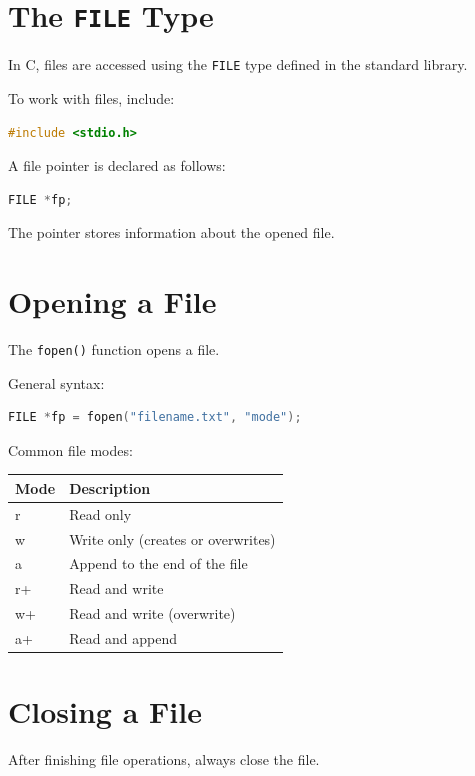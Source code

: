 \documentclass[12pt,openany]{book}
\begin{document}
\section{The \texttt{FILE} Type}

In C, files are accessed using the \texttt{FILE} type defined in the standard library.

To work with files, include:

\begin{lstlisting}[language=C]
#include <stdio.h>
\end{lstlisting}

A file pointer is declared as follows:

\begin{lstlisting}[language=C]
FILE *fp;
\end{lstlisting}

The pointer stores information about the opened file.
\section{Opening a File}

The \texttt{fopen()} function opens a file.

General syntax:

\begin{lstlisting}[language=C]
FILE *fp = fopen("filename.txt", "mode");
\end{lstlisting}

Common file modes:

\begin{center}
\begin{tabular}{|l|l|}
\hline
Mode & Description \\
\hline
r & Read only \\
w & Write only (creates or overwrites) \\
a & Append to the end of the file \\
r+ & Read and write \\
w+ & Read and write (overwrite) \\
a+ & Read and append \\
\hline
\end{tabular}
\end{center}

\section{Closing a File}

After finishing file operations, always close the file.
\end{document}
